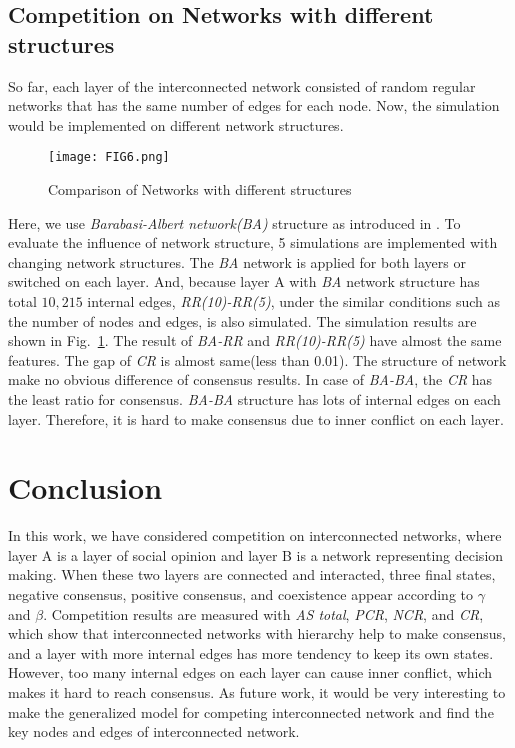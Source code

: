 \documentclass[english]{cccconf}
\begin{document}
\subsection{Competition on Networks with different structures}
So far, each layer of the interconnected network consisted of random regular networks that has the same number of edges for each node. Now, the simulation would be implemented on different network structures. 

\begin{figure}[!htb]
	\centering
	\texttt{[image: FIG6.png]}
	\caption{Comparison of Networks with different structures}
	\label{Fig6}
\end{figure}

Here, we use \textit{Barabasi-Albert network(BA)} structure as introduced in \cite{barabasi1999}. To evaluate the influence of network structure, 5 simulations are implemented with changing network structures. The \textit{BA} network is applied for both layers or switched on each layer. And, because layer A with \textit{BA} network structure has total $10,215$ internal edges, \textit{RR(10)-RR(5)}, under the similar conditions such as the number of nodes and edges, is also simulated. The simulation results are shown in Fig.~\ref{Fig6}. The result of \textit{BA-RR} and \textit{RR(10)-RR(5)} have almost the same features. The gap of \textit{CR} is almost same(less than 0.01). The structure of network make no obvious difference of consensus results. In case of \textit{BA-BA}, the \textit{CR} has the least ratio for consensus. \textit{BA-BA} structure has lots of internal edges on each layer. Therefore, it is hard to make consensus due to inner conflict on each layer. 

\section{Conclusion}
In this work, we have considered competition on interconnected networks, where layer A is a layer of social opinion and layer B is a network representing decision making. When these two layers are connected and interacted, three final states, negative consensus, positive consensus, and coexistence appear according to $\gamma$ and $\beta$. Competition results are measured with \textit{AS total}, \textit{PCR}, \textit{NCR}, and \textit{CR}, which show that interconnected networks with hierarchy help to make consensus, and a layer with more internal edges has more tendency to keep its own states. However, too many internal edges on each layer can cause inner conflict, which makes it hard to reach consensus. As future work, it would be very interesting to make the generalized model for competing interconnected network and find the key nodes and edges of interconnected network.
\end{document}
